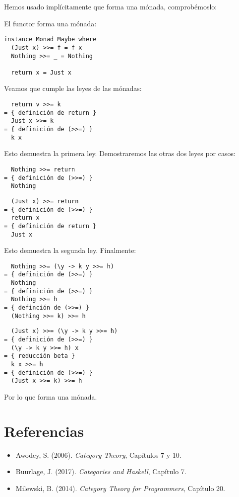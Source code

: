 Hemos usado implícitamente que  forma una mónada, comprobémoslo:
\begin{example}
El functor  forma una mónada:
\begin{verbatim}
instance Monad Maybe where
  (Just x) >>= f = f x
  Nothing >>= _ = Nothing

  return x = Just x
\end{verbatim}
Veamos que cumple las leyes de las mónadas:
\begin{verbatim}
  return v >>= k 
= { definición de return }
  Just x >>= k
= { definición de (>>=) }
  k x
\end{verbatim}
Esto demuestra la primera ley.
Demostraremos las otras dos leyes por casos:
\begin{verbatim}
  Nothing >>= return
= { definición de (>>=) }
  Nothing
\end{verbatim}
\begin{verbatim}
  (Just x) >>= return
= { definición de (>>=) }
  return x
= { definición de return }
  Just x
\end{verbatim}
Esto demuestra la segunda ley.
Finalmente:
\begin{verbatim}
  Nothing >>= (\y -> k y >>= h)
= { definición de (>>=) }
  Nothing
= { definición de (>>=) }
  Nothing >>= h
= { definción de (>>=) }
  (Nothing >>= k) >>= h
\end{verbatim}
\begin{verbatim}
  (Just x) >>= (\y -> k y >>= h)
= { definición de (>>=) }
  (\y -> k y >>= h) x
= { reducción beta }
  k x >>= h
= { definición de (>>=) }
  (Just x >>= k) >>= h
\end{verbatim}
Por lo que  forma una mónada.
\end{example}

\section{Referencias}
\begin{itemize}
  \item Awodey, S. (2006). \emph{Category Theory}, Capítulos 7 y 10.
  \item Buurlage, J. (2017). \emph{Categories and Haskell}, Capítulo 7.
  \item Milewski, B. (2014). \emph{Category Theory for Programmers}, Capítulo 20.
\end{itemize}
